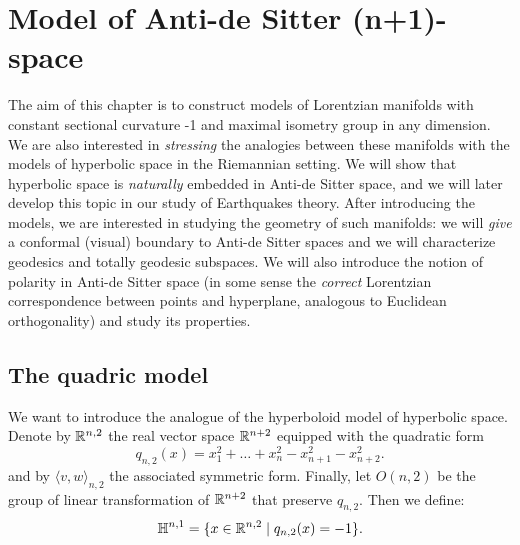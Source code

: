 \chapter{Model of Anti-de Sitter (n+1)-space}
The aim of this chapter is to construct models of Lorentzian manifolds with constant sectional curvature -1 and maximal isometry group in any dimension. We are also interested in \textit{stressing} the analogies between these manifolds with the models of hyperbolic space in the Riemannian setting. We will show that hyperbolic space is \textit{naturally} embedded in Anti-de Sitter space, and we will later develop this topic in our study of Earthquakes theory. After introducing the models, we are interested in studying the geometry of such manifolds: we will \textit{give} a conformal (visual) boundary to Anti-de Sitter spaces and we will characterize geodesics and totally geodesic subspaces. We will also introduce the notion of polarity in Anti-de Sitter space (in some sense the \textit{correct} Lorentzian correspondence between points and hyperplane, analogous to Euclidean orthogonality) and study its properties. 

\section{The quadric model}
We want to introduce the analogue of the hyperboloid model of hyperbolic space. Denote by $\mathbb{R}^{n,2}$ the real vector space $\mathbb{R}^{n+2}$ equipped with the quadratic form 
\[
    q_{n,2}(x)=x_1^{2}+\dots+x_n^{2}-x_{n+1}^{2}-x_{n+2}^2.   
\]
and by $\langle v,w\rangle_{n,2}$ the associated symmetric form. Finally, let $O(n,2)$ be the group of linear transformation of $\mathbb{R}^{n+2}$ that preserve $q_{n,2}.$
Then we define:
\[
    \mathbb{H}^{n,1}=\{x\in \mathbb{R}^{n,2}\;|\;q_{n,2}(x)=-1\}.
\]

